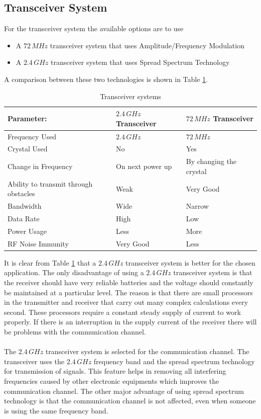 \subsection{Transceiver System}
%
For the transceiver system the available options are to use
%
\begin{itemize}
\item A $72\,MHz$ transceiver system that uses Amplitude/Frequency Modulation
\item A $2.4\,GHz$ transceiver system that uses Spread Spectrum Technology
\end{itemize}
%
A comparison between these two technologies is shown in Table \ref{tab:transceiver}.
%
\begin{table}
\centering
\caption{Transceiver systems}
\label{tab:transceiver}
\begin{tabular}{|l l l|}
\hline
\textbf{Parameter:} &  \textbf{$2.4\,GHz$ Transceiver} & \textbf{$72\,MHz$ Transceiver}\\ 
\hline
Frequency Used & $2.4\,GHz$ & $72\,MHz$ \\
Crystal Used & No & Yes \\
Change in Frequency & On next power up & By changing the crystal \\
Ability to transmit through obstacles & Weak & Very Good\\
Bandwidth & Wide & Narrow\\
Data Rate & High & Low\\
Power Usage & Less & More\\
RF Noise Immunity & Very Good & Less \\
\hline
\end{tabular}
\end{table}
%
It is clear from Table \ref{tab:transceiver} that a $2.4\,GHz$ transceiver system is better for the chosen application. The only disadvantage of using a $2.4\,GHz$ transceiver system is that the receiver should have very reliable batteries and the voltage should constantly be maintained at a particular level. The reason is that there are small processors in the transmitter and receiver that carry out many complex calculations every second. These processors require a constant steady supply of current to work properly. If there is an interruption in the supply current of the receiver there will be problems with the communication channel.
\\
\\
The $2.4\,GHz$ transceiver system is selected for the communication channel. The transceiver uses the $2.4\,GHz$ frequency band and the spread spectrum technology for transmission of signals. This feature helps in removing all interfering frequencies caused by other electronic equipments which improves the communication channel. The other major advantage of using spread spectrum technology is that the communication channel is not affected, even when someone is using the same frequency band.
%
